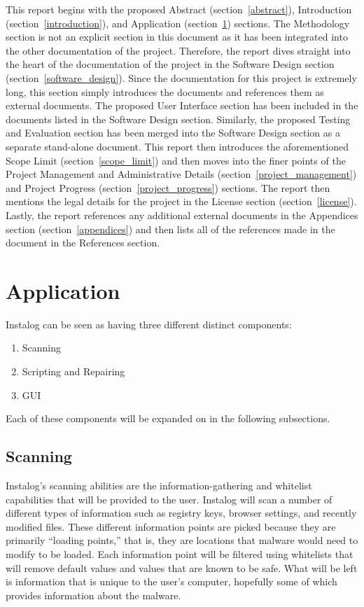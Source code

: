 \documentclass[letterpaper,12pt]{article}
\begin{document}
This report begins with the proposed Abstract (section~\ref{abstract}),
Introduction (section~\ref{introduction}), and Application
(section~\ref{application}) sections.  The Methodology section is not an
explicit section in this document as it has been integrated into the other
documentation of the project.  Therefore, the report dives straight into the
heart of the documentation of the project in the Software Design section
(section~\ref{software_design}).  Since the documentation for this project is
extremely long, this section simply introduces the documents and references them
as external documents.  The proposed User Interface section has been included in
the documents listed in the Software Design section.  Similarly, the proposed
Testing and Evaluation section has been merged into the Software Design section
as a separate stand-alone document. This report then introduces the
aforementioned Scope Limit (section~\ref{scope_limit}) and then moves into the
finer points of the Project Management and Administrative Details
(section~\ref{project_management}) and Project Progress
(section~\ref{project_progress}) sections.  The report then mentions the legal
details for the project in the License section (section~\ref{license}).  Lastly,
the report references any additional external documents in the Appendices
section (section~\ref{appendices}) and then lists all of the references made in
the document in the References section.

\newpage



\section{Application} \label{application}
Instalog can be seen as having three different distinct components:

\begin{enumerate}
  \item Scanning
  \item Scripting and Repairing
  \item GUI
\end{enumerate}

Each of these components will be expanded on in the following subsections.

\subsection{Scanning}
Instalog's scanning abilities are the information-gathering and whitelist
capabilities that will be provided to the user.  Instalog will scan a number of
different types of information such as registry keys, browser settings, and
recently modified files.  These different information points are picked because
they are primarily ``loading points,'' that is, they are locations that malware
would need to modify to be loaded.  Each information point will be filtered
using whitelists that will remove default values and values that are known to be
safe.  What will be left is information that is unique to the user's computer,
hopefully some of which provides information about the malware.
\end{document}
